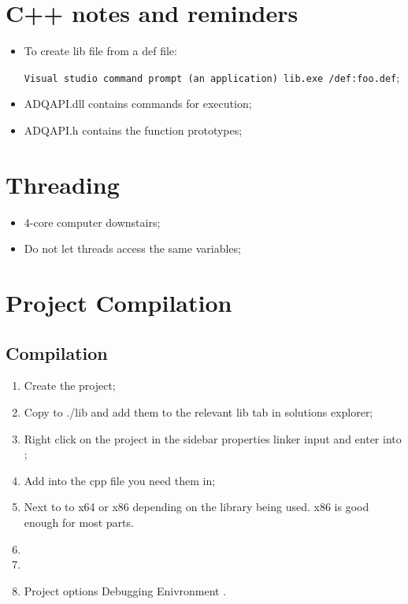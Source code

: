 \section{C++ notes and reminders}

\begin{itemize}
\item To create lib file from a def file:
  \begin{center}
    \texttt{Visual studio command prompt  (an application) \ira lib.exe
      /def:foo.def};
  \end{center}
\item ADQAPI.dll contains commands for execution;
\item ADQAPI.h contains the function prototypes;
\end{itemize}

\section{Threading}
\begin{itemize}
\item 4-core computer downstairs;
\item Do not let threads access the same variables;
\end{itemize}

\section{Project Compilation}
\subsection{Compilation}
\begin{enumerate}
\item Create the project;
\item   Copy    to  ./lib and add them  to the relevant lib  tab in
  solutions explorer;
\item Right  click on the project  in the sidebar \ira  properties \ira
  linker  \ira input  and enter   into  ;
\item Add  into the cpp file you
  need them in;
\item  Next  to    to  x64  or  x86
  depending on  the library being  used.  x86  is good enough  for most
  parts.
\item {}
\item     {}
\item {}   Project options  \ira  Debugging  \ira Enivronment  \ira
  .
\end{enumerate}
